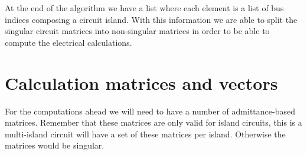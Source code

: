\documentclass[nols,a4paper,twoside,notoc,fleqn]{tufte-book}
\begin{document}
At the end of the algorithm we have a list where each element is a list of bus indices composing a circuit island. With this information we are able to split the singular circuit matrices into non-singular matrices in order to be able to compute the electrical calculations.

\section{Calculation matrices and vectors}  \label{Y_calculation}

For the computations ahead we will need to have a number of admittance-based matrices. Remember that these matrices are only valid for island circuits, this is a multi-island circuit will have a set of these matrices per island. Otherwise the matrices would be singular.

%	
%	
%	
%	
%	
%	
%	
%	
%	
%	
%	
%	
%	
%	
%	
%
%
\end{document}
